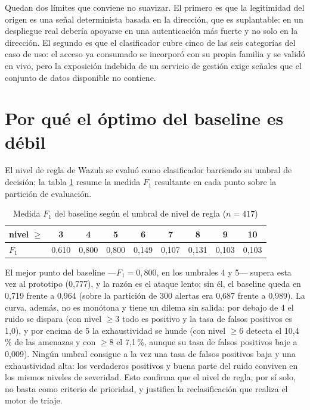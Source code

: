 Quedan dos límites que conviene no suavizar. El primero es que la legitimidad del origen es una
señal determinista basada en la dirección, que es suplantable: en un despliegue real debería
apoyarse en una autenticación más fuerte y no solo en la dirección. El segundo es que el
clasificador cubre cinco de las seis categorías del caso de uso: el acceso ya consumado se
incorporó con su propia familia y se validó en vivo, pero la exposición indebida de un servicio de
gestión exige señales que el conjunto de datos disponible no contiene.

\section{Por qué el óptimo del baseline es débil}

El nivel de regla de Wazuh se evaluó como clasificador barriendo su umbral de decisión; la tabla
\ref{tab:barrido-baseline} resume la medida $F_1$ resultante en cada punto sobre la partición de
evaluación.

\begin{table}[H]
  \centering
  \caption{Medida $F_1$ del baseline según el umbral de nivel de regla ($n=417$)}
  \label{tab:barrido-baseline}
  \begin{tabular}{@{}lcccccccc@{}}
    \toprule
    nivel $\geq$ & 3 & 4 & 5 & 6 & 7 & 8 & 9 & 10 \\
    \midrule
    $F_1$ & 0,610 & 0,800 & 0,800 & 0,149 & 0,107 & 0,131 & 0,103 & 0,103 \\
    \bottomrule
  \end{tabular}
\end{table}

El mejor punto del baseline ---$F_1=0,800$, en los umbrales 4 y 5--- supera esta vez al prototipo
(0,777), y la razón es el ataque lento; sin él, el baseline queda en 0,719 frente a 0,964 (sobre la
partición de 300 alertas era 0,687 frente a 0,989). La curva, además, no es monótona y tiene un
dilema sin salida: por debajo de 4 el ruido se dispara (con nivel $\geq 3$ todo es positivo y la
tasa de falsos positivos es 1,0), y por encima de 5 la exhaustividad se hunde (con nivel $\geq 6$
detecta el 10,4\,\% de las amenazas y con $\geq 8$ el 7,1\,\%, aunque su tasa de falsos positivos
baje a 0,009). Ningún umbral consigue a la vez una tasa de falsos positivos baja y una exhaustividad
alta: los verdaderos positivos y buena parte del ruido conviven en los mismos niveles de
severidad. Esto confirma que el nivel de regla, por sí solo, no basta como criterio de prioridad, y
justifica la reclasificación que realiza el motor de triaje.

